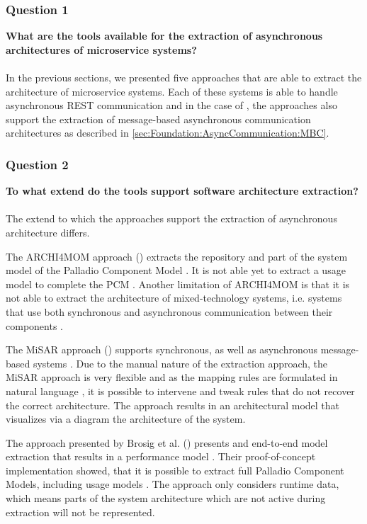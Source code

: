 \subsubsection{Question 1}
\textbf{What are the tools available for the extraction of asynchronous architectures of microservice systems?}
\\ \\
In the previous sections, we presented five approaches that are able to extract the architecture of microservice systems.
Each of these systems is able to handle asynchronous REST communication and in the case of \cite{Singh2022ARCHI4MOM,Alshuqayran2018MiSAR,Brosig2011}, the approaches also support the extraction of message-based asynchronous communication architectures as described in \autoref{sec:Foundation:AsyncCommunication:MBC}.

\subsubsection{Question 2}
\textbf{To what extend do the tools support software architecture extraction?}
\\ \\
The extend to which the approaches support the extraction of asynchronous architecture differs.

The ARCHI4MOM approach (\cite{Singh2022ARCHI4MOM}) extracts the repository and part of the system model of the Palladio Component Model \cite{Singh2022ARCHI4MOM}.
It is not able yet to extract a usage model to complete the PCM \cite{Singh2022ARCHI4MOM}.
Another limitation of ARCHI4MOM is that it is not able to extract the architecture of mixed-technology systems, i.e. systems that use both synchronous and asynchronous communication between their components \cite{Singh2022ARCHI4MOM}.

The MiSAR approach (\cite{Alshuqayran2018MiSAR}) supports synchronous, as well as asynchronous message-based systems \cite{Alshuqayran2020Thesis}.
Due to the manual nature of the extraction approach, the MiSAR approach is very flexible and as the mapping rules are formulated in natural language \cite{Alshuqayran2020Thesis}, it is possible to intervene and tweak rules that do not recover the correct architecture.
The approach results in an architectural model that visualizes via a diagram the architecture of the system.

The approach presented by Brosig et al. (\cite{Brosig2011}) presents and end-to-end model extraction that results in a performance model \cite{Brosig2011}.
Their proof-of-concept implementation showed, that it is possible to extract full Palladio Component Models, including usage models \cite{Brosig2011}.
The approach only considers runtime data, which means parts of the system architecture which are not active during extraction will not be represented.

